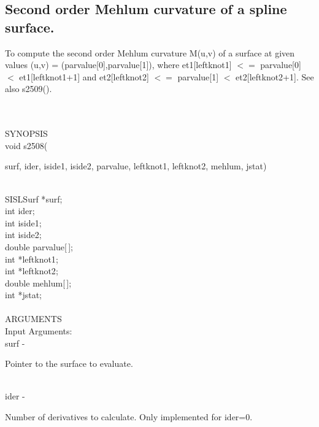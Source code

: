 \subsection{Second order Mehlum curvature of a spline surface.}
\begin{minipg1}
To compute the second order Mehlum curvature M(u,v) of a 
                   surface at given values (u,v) = (parvalue[0],parvalue[1]), 
                   where
                    et1[leftknot1] $<=$ parvalue[0] $<$ et1[leftknot1+1] and
                    et2[leftknot2] $<=$ parvalue[1] $<$ et2[leftknot2+1].
                   See also s2509().
\end{minipg1} \\ \\
SYNOPSIS\\
        \>  void s2508(\begin{minipg3}
            {\fov surf},  {\fov ider},  {\fov iside1},  {\fov iside2},  {\fov parvalue},  {\fov leftknot1},  {\fov leftknot2},  {\fov mehlum},  {\fov jstat})
                \end{minipg3}\\
                \>\>    SISLSurf \> *{\fov surf};\\
                \>\>    int    \>  {\fov ider};\\
                \>\>    int    \>  {\fov iside1};\\
                \>\>    int    \>  {\fov iside2};\\
                \>\>    double \> {\fov parvalue}[\,];\\
                \>\>    int \> *{\fov leftknot1};\\
                \>\>    int \> *{\fov leftknot2};\\
                \>\>    double \> {\fov mehlum}[\,];\\
                \>\>    int \> *{\fov jstat};\\
\\
ARGUMENTS\\
	\>Input Arguments:\\
        \>\>    {\fov surf}\> - \>  \begin{minipg2}
                     Pointer to the surface to evaluate.
                               \end{minipg2}\\[0.8ex]
        \>\>    {\fov ider}\> - \>  \begin{minipg2}
                     Number of derivatives to calculate.
                     Only implemented for ider=0.
                               \end{minipg2}\\[0.8ex]
